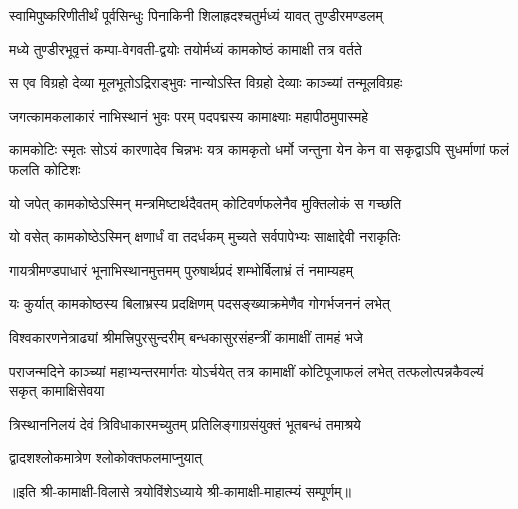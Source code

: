 

\twolineshloka
{स्वामिपुष्करिणीतीर्थं पूर्वसिन्धुः पिनाकिनी}
{शिलाह्रदश्चतुर्मध्यं यावत् तुण्डीरमण्डलम्}

\twolineshloka
{मध्ये तुण्डीरभूवृत्तं कम्पा-वेगवती-द्वयोः}
{तयोर्मध्यं कामकोष्ठं कामाक्षी तत्र वर्तते}

\twolineshloka
{स एव विग्रहो देव्या मूलभूतोऽद्रिराड्भुवः}
{नान्योऽस्ति विग्रहो देव्याः काञ्च्यां तन्मूलविग्रहः}

\twolineshloka
{जगत्कामकलाकारं नाभिस्थानं भुवः परम्}
{पदपद्मस्य कामाक्ष्याः महापीठमुपास्महे}

\threelineshloka
{कामकोटिः स्मृतः सोऽयं कारणादेव चिन्नभः}
{यत्र कामकृतो धर्मो जन्तुना येन केन वा}
{सकृद्वाऽपि सुधर्माणां फलं फलति कोटिशः}

\twolineshloka
{यो जपेत् कामकोष्ठेऽस्मिन् मन्त्रमिष्टार्थदैवतम्}
{कोटिवर्णफलेनैव मुक्तिलोकं स गच्छति}

\twolineshloka
{यो वसेत् कामकोष्ठेऽस्मिन् क्षणार्धं वा तदर्धकम्}
{मुच्यते सर्वपापेभ्यः साक्षाद्देवी नराकृतिः}

\twolineshloka
{गायत्रीमण्डपाधारं भूनाभिस्थानमुत्तमम्}
{पुरुषार्थप्रदं शम्भोर्बिलाभ्रं तं नमाम्यहम्}

\twolineshloka
{यः कुर्यात् कामकोष्ठस्य बिलाभ्रस्य प्रदक्षिणम्}
{पदसङ्ख्याक्रमेणैव गोगर्भजननं लभेत्}

\twolineshloka
{विश्वकारणनेत्राढ्यां श्रीमत्त्रिपुरसुन्दरीम्}
{बन्धकासुरसंहन्त्रीं कामाक्षीं तामहं भजे}

\threelineshloka
{पराजन्मदिने काञ्च्यां महाभ्यन्तरमार्गतः}
{योऽर्चयेत् तत्र कामाक्षीं कोटिपूजाफलं लभेत्}
{तत्फलोत्पन्नकैवल्यं सकृत् कामाक्षिसेवया}

\twolineshloka
{त्रिस्थाननिलयं देवं त्रिविधाकारमच्युतम्}
{प्रतिलिङ्गाग्रसंयुक्तं भूतबन्धं तमाश्रये}

{द्वादशश्लोकमात्रेण श्लोकोक्तफलमाप्नुयात्}

॥इति श्री-कामाक्षी-विलासे त्रयोविंशेऽध्याये श्री-कामाक्षी-माहात्म्यं सम्पूर्णम्॥